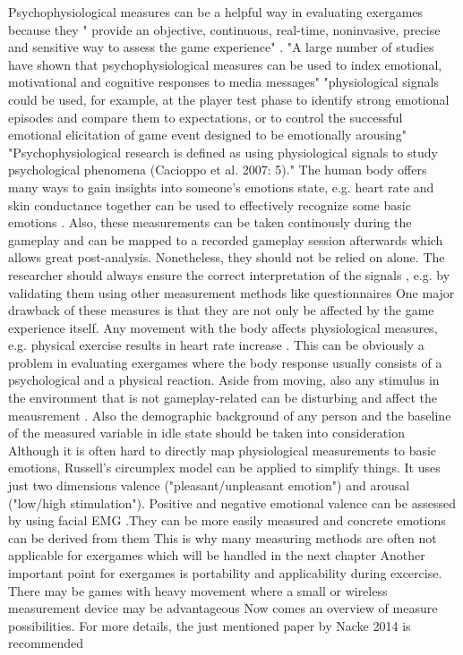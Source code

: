Psychophysiological measures can be a helpful way in evaluating exergames because they " provide an objective, continuous, real-time, noninvasive, precise and sensitive way to assess the game experience" \cite{kivikangas2011review}. 
"A large number of studies have shown that psychophysiological measures can be used to index emotional, motivational and cognitive responses to media messages" \cite{kivikangas2011review}
"physiological signals could be used, for example, at the player test phase to identify strong emotional
episodes and compare them to expectations, or to control the successful emotional elicitation of game event designed to be emotionally arousing" \cite{kivikangas2011review}
"Psychophysiological research is defined as using physiological signals to study
psychological phenomena (Cacioppo et al. 2007: 5)." \cite{kivikangas2011review}
The human body offers many ways to gain insights into someone's emotions state, e.g. heart rate and skin conductance together can be used to effectively recognize some basic emotions \cite{hamdi2015emotion}. Also, these measurements can be taken continously during the gameplay and can be mapped to a recorded gameplay session afterwards \cite{nacke2015physiological} which allows great post-analysis. Nonetheless, they should not be relied on alone. The researcher should always ensure the correct interpretation of the signals \cite{nacke2015physiological}, e.g. by validating them using other measurement methods like questionnaires 
One major drawback of these measures is that they are not only be affected by the game experience itself. Any movement with the body affects physiological measures, e.g. physical exercise results in heart rate increase \cite{javorka2002heart}. This can be obviously a problem in evaluating exergames where the body response usually consists of a psychological and a physical reaction. Aside from moving, also any stimulus in the environment that is not gameplay-related can be disturbing and affect the meausrement \cite{nacke2015physiological}. Also the demographic background of any person and the baseline of the measured variable in idle state should be taken into consideration \cite{nacke2015physiological} 
Although it is often hard to directly map physiological measurements to basic emotions, Russell’s circumplex model can be applied to simplify things. It uses just two dimensions valence ("pleasant/unpleasant emotion") and arousal ("low/high stimulation"). Positive and negative emotional valence can be assessed by using facial EMG \cite{kivikangas2011review}.They can be more easily measured and concrete emotions can be derived from them \cite{seo2019automatic} 
This is why many measuring methods are often not applicable for exergames which will be handled in the next chapter 
Another important point for exergames is portability and applicability during excercise. There may be games with heavy movement where a small or wireless measurement device may be advantageous 
Now comes an overview of measure possibilities. For more details, the just mentioned paper by Nacke 2014 is recommended 




